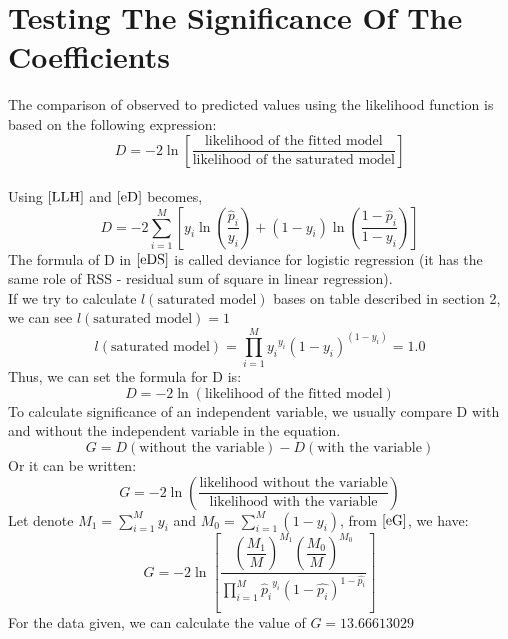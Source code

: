 \documentclass{article}
\begin{document}
\section {Testing The Significance Of The Coefficients} 
    The comparison of observed to predicted values using the likelihood function is based on the following expression:
    \begin{equation} 
        \label{eD}
        D = -2\ln\left[\dfrac{\text{likelihood of the fitted model}}{\text{likelihood of the saturated model}} \right]
    \end{equation}
    \\
    Using $\ref{LLH}$ and $\ref{eD}$ becomes, 
    \\
    \begin{equation} 
        \label{eDS}
        D = -2 \sum_{i=1}^{M} \left[y_{i}\ln\left(\dfrac{\hat{p}_{i}}{y_{i}} \right) + (1 - y_{i})\ln\left(\dfrac{1 - \hat{p}_{i}}{1 - y_{i}} \right)\right]
    \end{equation}
    The formula of D in $\ref{eDS}$ is called deviance for logistic regression (it has the same role of RSS - residual sum of square in linear regression).
    \\ 
    If we try to calculate $l(\text{saturated model})$ bases on table described in section 2, we can see  ${l(\text{saturated model}) = 1}$
    \\
    \begin{equation} 
         l(\text{saturated model}) = \prod_{i=1}^{M} {y_{i}}^{y_{i}} (1 - y_{i})^{(1 - y_{i})} = 1.0
    \end{equation}
    Thus, we can set the formula for D is: 
    \begin{equation} 
        D = -2\ln(\text{likelihood of the fitted model})
    \end{equation} 
    To calculate significance of an independent variable, we usually compare D with and without the independent variable in the equation. 
    \begin{equation} 
        G = D(\text{without the variable} ) - D(\text{with the variable})
    \end{equation} 
    Or it can be written: 
    \begin{equation} 
        \label{eG}
        G   = -2\ln\left(\dfrac{\text{likelihood without the variable}}{\text{likelihood with the variable}}\right)
    \end{equation} 
    Let denote $M_{1} = \sum_{i=1}^{M} y_{i}$ and $M_{0} = \sum_{i=1}^{M} (1 - y_{i})$, from $\ref{eG}$, we have: 
    \begin{equation} 
        G = -2 \ln \left[ \dfrac{\left(\dfrac{M_{1}}{M}\right)^{M_{1}}\left(\dfrac{M_{0}}{M}\right)^{M_{0}} }{\prod_{i=1}^{M} {\hat{p}_{i}}^{y_{i}} (1 - \hat{p_{i}})^{1 - \hat{p_{i}}}}\right]
    \end{equation}
    For the data given, we can calculate the value of $G = 13.66613029$
        
\end{document}
